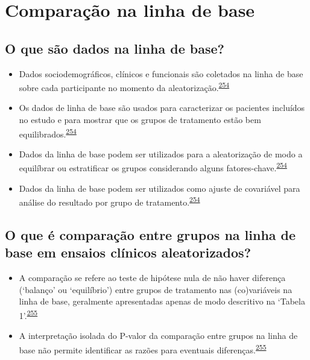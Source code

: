 \documentclass[
  a4paper,
]{book}
\begin{document}
\hypertarget{comparacao-linha-de-base}{%
\section{Comparação na linha de base}\label{comparacao-linha-de-base}}

\hypertarget{o-que-suxe3o-dados-na-linha-de-base}{%
\subsection{O que são dados na linha de base?}\label{o-que-suxe3o-dados-na-linha-de-base}}

\begin{itemize}
\item
  Dados sociodemográficos, clínicos e funcionais são coletados na linha de base sobre cada participante no momento da aleatorização.\textsuperscript{\protect\hyperlink{ref-Assmann2000}{254}}
\item
  Os dados de linha de base são usados para caracterizar os pacientes incluídos no estudo e para mostrar que os grupos de tratamento estão bem equilibrados.\textsuperscript{\protect\hyperlink{ref-Assmann2000}{254}}
\item
  Dados da linha de base podem ser utilizados para a aleatorização de modo a equilíbrar ou estratificar os grupos considerando alguns fatores-chave.\textsuperscript{\protect\hyperlink{ref-Assmann2000}{254}}
\item
  Dados da linha de base podem ser utilizados como ajuste de covariável para análise do resultado por grupo de tratamento.\textsuperscript{\protect\hyperlink{ref-Assmann2000}{254}}
\end{itemize}

\hypertarget{o-que-uxe9-comparauxe7uxe3o-entre-grupos-na-linha-de-base-em-ensaios-cluxednicos-aleatorizados}{%
\subsection{O que é comparação entre grupos na linha de base em ensaios clínicos aleatorizados?}\label{o-que-uxe9-comparauxe7uxe3o-entre-grupos-na-linha-de-base-em-ensaios-cluxednicos-aleatorizados}}

\begin{itemize}
\item
  A comparação se refere ao teste de hipótese nula de não haver diferença (`balanço' ou `equilíbrio') entre grupos de tratamento nas (co)variáveis na linha de base, geralmente apresentadas apenas de modo descritivo na `Tabela 1'.\textsuperscript{\protect\hyperlink{ref-Stang2018}{255}}
\item
  A interpretação isolada do P-valor da comparação entre grupos na linha de base não permite identificar as razões para eventuais diferenças.\textsuperscript{\protect\hyperlink{ref-Stang2018}{255}}
\end{itemize}
\end{document}
